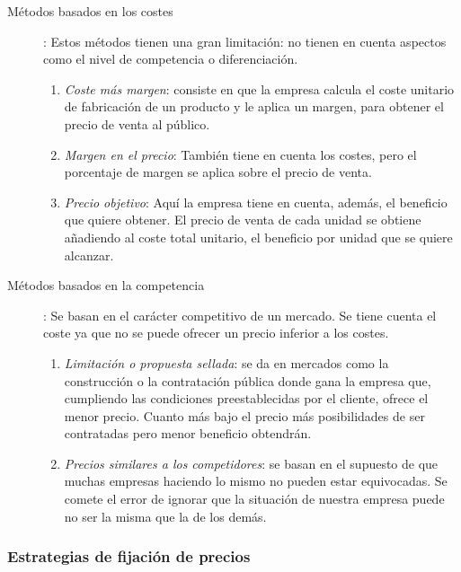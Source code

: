\documentclass[10pt,a4paper,spanish]{report}
\begin{document}
		\begin{description}
			\item[Métodos basados en los costes]: Estos métodos tienen una gran limitación: no tienen en cuenta aspectos como el nivel de competencia o diferenciación.
			\begin{enumerate}
				\item \textit{\textcolor[rgb]{0.1,0.2,0.4}{Coste más margen}}: consiste en que la empresa calcula el coste unitario de fabricación de un producto y le aplica un margen, para obtener el precio de venta al público.
				\item \textit{\textcolor[rgb]{0.1,0.2,0.4}{Margen en el precio}}: También tiene en cuenta los costes, pero el porcentaje de margen se aplica sobre el precio de venta.
				\item \textit{\textcolor[rgb]{0.1,0.2,0.4}{Precio objetivo}}: Aquí la empresa tiene en cuenta, además, el beneficio que quiere obtener. El precio de venta de cada unidad se obtiene añadiendo al coste total unitario, el beneficio por unidad que se quiere alcanzar.
			\end{enumerate}
			\item[Métodos basados en la competencia]: Se basan en el carácter competitivo de un mercado. Se tiene cuenta el coste ya que no se puede ofrecer un precio inferior a los costes.
			\begin{enumerate}
				\item \textit{\textcolor[rgb]{0.1,0.2,0.4}{Limitación o propuesta sellada}}: se da en mercados como la construcción o la contratación pública donde gana la empresa que, cumpliendo las condiciones preestablecidas por el cliente, ofrece el menor precio. Cuanto más bajo el precio más posibilidades de ser contratadas pero menor beneficio obtendrán.
				\item \textit{\textcolor[rgb]{0.1,0.2,0.4}{Precios similares a los competidores}}: se basan en el supuesto de que muchas empresas haciendo lo mismo no pueden estar equivocadas. Se comete el error de ignorar que la situación de nuestra empresa puede no ser la misma que la de los demás.
			\end{enumerate}
		\end{description}

		\subsubsection{\textcolor[rgb]{0.1,0.2,0.4}Estrategias de fijación de precios}
\end{document}
